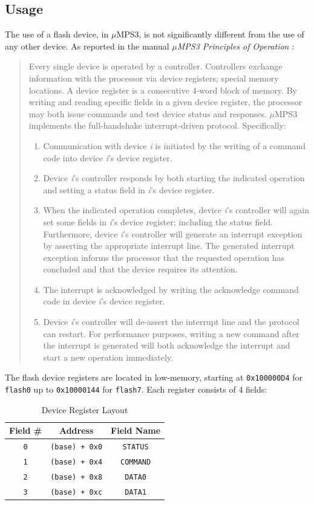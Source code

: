 \documentclass[12pt,a4paper,openright,twoside]{report}
\begin{document}
\subsection{Usage}
The use of a flash device, in $\mu$MPS3, is not significantly different from the use of any other device.
As reported in the manual \textit{$\mu$MPS3 Principles of Operation} \cite{pops}:
\begin{quote}
	Every single device is operated by a controller.
	Controllers exchange information with the processor via device registers; special memory locations.
	A device register is a consecutive 4-word block of memory.
	By writing and reading specific fields in a given device register, the processor may both issue commands and test device status and responses.
	$\mu$MPS3 implements the full-handshake interrupt-driven protocol.
	Specifically:
	\begin{enumerate}
		\item Communication with device \textit{i} is initiated by the writing of a command code into device \textit{i}'s device register.
		\item Device \textit{i}'s controller responds by both starting the indicated operation and setting a status field in \textit{i}'s device register.
		\item When the indicated operation completes, device \textit{i}'s controller will again set some fields in \textit{i}'s device register; including the status field.
		      Furthermore, device \textit{i}'s controller will generate an interrupt exception by asserting the appropriate interrupt line.
		      The generated interrupt exception informs the processor that the requested operation has concluded and that the device requires its attention.
		\item The interrupt is acknowledged by writing the acknowledge command code in device \textit{i}'s device register.
		\item Device \textit{i}'s controller will de-assert the interrupt line and the protocol can restart.
		      For performance purposes, writing a new command after the interrupt is generated will both acknowledge the interrupt and start a new operation immediately.
	\end{enumerate}
\end{quote}
The flash device registers are located in low-memory, starting at \texttt{0x100000D4} for \texttt{flash0} up to \texttt{0x10000144} for \texttt{flash7}.
Each register consists of 4 fields:
\begin{table}[h]
	\centering
	\begin{tabular}{c|c|c}
		Field \#   & Address               & Field Name       \\  \hline\hline
		\texttt{0} & \texttt{(base) + 0x0} & \texttt{STATUS}  \\ \hline
		\texttt{1} & \texttt{(base) + 0x4} & \texttt{COMMAND} \\ \hline
		\texttt{2} & \texttt{(base) + 0x8} & \texttt{DATA0}   \\ \hline
		\texttt{3} & \texttt{(base) + 0xc} & \texttt{DATA1}
	\end{tabular}
	\caption{Device Register Layout}
	\label{tab:device_register_layout}
\end{table}
\end{document}
